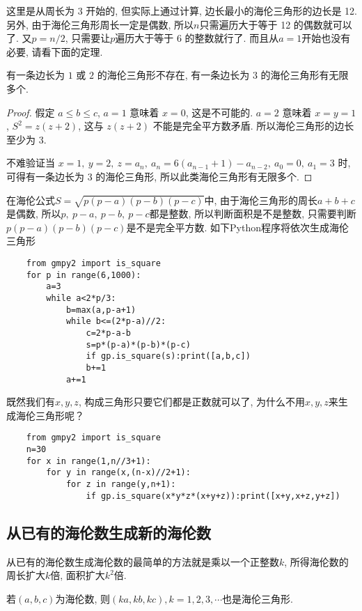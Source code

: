 \documentclass[12pt]{article}
\begin{document}
这里是从周长为 3 开始的, 但实际上通过计算, 边长最小的海伦三角形的边长是 12. 另外, 由于海伦三角形周长一定是偶数, 所以$n$只需遍历大于等于 12 的偶数就可以了. 又$p=n/2$, 只需要让$p$遍历大于等于 6 的整数就行了. 而且从$a=1$开始也没有必要, 请看下面的定理. 

\begin{theorem}
    有一条边长为 $1$ 或 $2$ 的海伦三角形不存在, 有一条边长为 $3$ 的海伦三角形有无限多个. 
\end{theorem}
\begin{proof}
    假定 $a\le b\le c$, $a=1$ 意味着 $x=0$, 这是不可能的. $a=2$ 意味着 $x=y=1$, $S^2=z(z+2)$, 这与 $z(z+2)$ 不能是完全平方数矛盾. 所以海伦三角形的边长至少为 3. \par
    不难验证当 $x=1,\ y=2,\ z=a_n,\ a_n=6(a_{n-1}+1)-a_{n-2},\ a_0=0,\ a_1=3$ 时, 可得有一条边长为 3 的海伦三角形, 所以此类海伦三角形有无限多个. 
\end{proof}

在海伦公式$S=\sqrt{p(p-a)(p-b)(p-c)}$中, 由于海伦三角形的周长$a+b+c$是偶数, 所以$p,\ p-a,\ p-b,\ p-c$都是整数, 所以判断面积是不是整数, 只需要判断$p(p-a)(p-b)(p-c)$是不是完全平方数. 如下Python程序将依次生成海伦三角形
\begin{verbatim}
    from gmpy2 import is_square
    for p in range(6,1000):
        a=3
        while a<2*p/3:
            b=max(a,p-a+1)
            while b<=(2*p-a)//2:
                c=2*p-a-b
                s=p*(p-a)*(p-b)*(p-c)
                if gp.is_square(s):print([a,b,c])
                b+=1
            a+=1
\end{verbatim}

既然我们有$x,y,z$, 构成三角形只要它们都是正数就可以了, 为什么不用$x,y,z$来生成海伦三角形呢？
\begin{verbatim}
    from gmpy2 import is_square
    n=30
    for x in range(1,n//3+1):
        for y in range(x,(n-x)//2+1):
            for z in range(y,n+1):
                if gp.is_square(x*y*z*(x+y+z)):print([x+y,x+z,y+z])
\end{verbatim}



\subsection{从已有的海伦数生成新的海伦数}
从已有的海伦数生成海伦数的最简单的方法就是乘以一个正整数$k$, 所得海伦数的周长扩大$k$倍, 面积扩大$k^2$倍. 
   
\begin{theorem}
    若$(a,b,c)$为海伦数, 则$(ka,kb,kc),k=1,2,3,\cdots$也是海伦三角形. \end{theorem}
\end{document}
